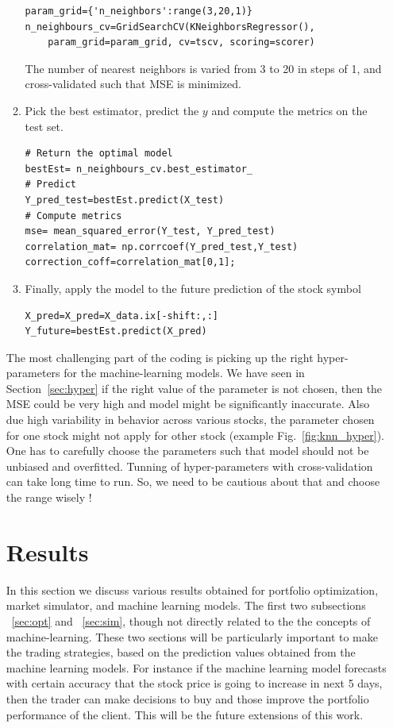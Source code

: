 \documentclass[12pt]{article}
\begin{document}
\begin{itemize}
\begin{enumerate}
\begin{verbatim}
param_grid={'n_neighbors':range(3,20,1)}
n_neighbours_cv=GridSearchCV(KNeighborsRegressor(),
	param_grid=param_grid, cv=tscv, scoring=scorer)
\end{verbatim}

The number of nearest neighbors is varied from 3 to 20 in steps of 1, and cross-validated such that MSE is minimized.

\item Pick the best estimator, predict the $y$ and compute the metrics on the test set.

\begin{verbatim}
# Return the optimal model
bestEst= n_neighbours_cv.best_estimator_
# Predict
Y_pred_test=bestEst.predict(X_test) 
# Compute metrics
mse= mean_squared_error(Y_test, Y_pred_test)
correlation_mat= np.corrcoef(Y_pred_test,Y_test)
correction_coff=correlation_mat[0,1];
\end{verbatim}

\item Finally, apply the model to the future prediction of the stock symbol

\begin{verbatim}
X_pred=X_pred=X_data.ix[-shift:,:] 
Y_future=bestEst.predict(X_pred)
\end{verbatim}

\end{enumerate}

The most challenging part of the coding is picking up the right hyper-parameters for the machine-learning models. We have seen in Section~\ref{sec:hyper} if the right value of the parameter is not chosen, then the MSE could be very high and model might be significantly inaccurate. Also due high variability in  behavior across various stocks, the parameter chosen for one stock might not apply for other stock (example Fig.~\ref{fig:knn_hyper}). One has to carefully choose the parameters such that model should not be unbiased and overfitted. 
Tunning of hyper-parameters with cross-validation can take long time to run. So, we need to be cautious about that and choose the range wisely !

\section{Results}

In this section we discuss various results obtained for portfolio optimization, market simulator, and machine learning models. The first two subsections ~\ref{sec:opt} and ~\ref{sec:sim}, though not directly related to the the concepts of machine-learning. These two sections will be particularly important to make the trading strategies, based on the prediction values obtained from the machine learning models. For instance if the machine learning model forecasts with certain accuracy that the stock price is going to increase in next 5 days, then the trader can make decisions to buy and those improve the portfolio performance of the client. This will be the future extensions of this work.



\end{itemize}
\end{document}
